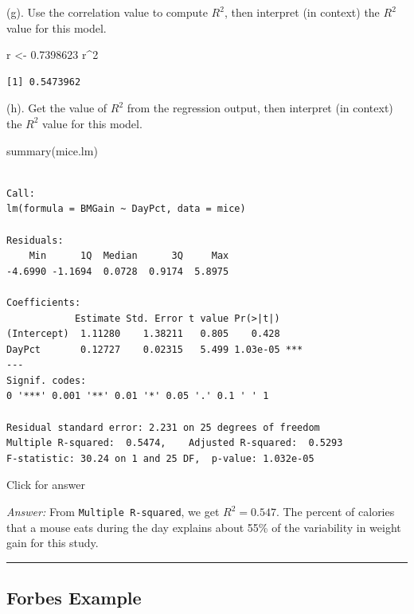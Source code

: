 \documentclass[
]{book}
\newenvironment{Shaded}{\begin{snugshade}}{\end{snugshade}}
\newcommand{\DecValTok}[1]{\textcolor[rgb]{0.00,0.00,0.81}{#1}}
\newcommand{\FloatTok}[1]{\textcolor[rgb]{0.00,0.00,0.81}{#1}}
\newcommand{\FunctionTok}[1]{\textcolor[rgb]{0.00,0.00,0.00}{#1}}
\newcommand{\NormalTok}[1]{#1}
\newcommand{\OtherTok}[1]{\textcolor[rgb]{0.56,0.35,0.01}{#1}}
\newcommand{\SpecialCharTok}[1]{\textcolor[rgb]{0.00,0.00,0.00}{#1}}
\begin{document}
(g). Use the correlation value to compute \(R^2\), then interpret (in context) the \(R^2\) value for this model.

\begin{Shaded}
\begin{Highlighting}[]
\NormalTok{r }\OtherTok{\textless{}{-}} \FloatTok{0.7398623}
\NormalTok{r}\SpecialCharTok{\^{}}\DecValTok{2}
\end{Highlighting}
\end{Shaded}

\begin{verbatim}
[1] 0.5473962
\end{verbatim}

(h). Get the value of \(R^2\) from the regression output, then interpret (in context) the \(R^2\) value for this model.

\begin{Shaded}
\begin{Highlighting}[]
\FunctionTok{summary}\NormalTok{(mice.lm)}
\end{Highlighting}
\end{Shaded}

\begin{verbatim}

Call:
lm(formula = BMGain ~ DayPct, data = mice)

Residuals:
    Min      1Q  Median      3Q     Max 
-4.6990 -1.1694  0.0728  0.9174  5.8975 

Coefficients:
            Estimate Std. Error t value Pr(>|t|)    
(Intercept)  1.11280    1.38211   0.805    0.428    
DayPct       0.12727    0.02315   5.499 1.03e-05 ***
---
Signif. codes:  
0 '***' 0.001 '**' 0.01 '*' 0.05 '.' 0.1 ' ' 1

Residual standard error: 2.231 on 25 degrees of freedom
Multiple R-squared:  0.5474,    Adjusted R-squared:  0.5293 
F-statistic: 30.24 on 1 and 25 DF,  p-value: 1.032e-05
\end{verbatim}

Click for answer

\emph{Answer:} From \texttt{Multiple\ R-squared}, we get \(R^2 = 0.547\). The percent of calories that a mouse eats during the day explains about 55\% of the variability in weight gain for this study.

\begin{center}\rule{0.5\linewidth}{0.5pt}\end{center}

\hypertarget{forbes-example}{%
\subsection{Forbes Example}\label{forbes-example}}
\end{document}
